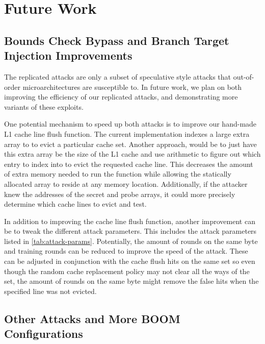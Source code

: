 \section{Future Work} \label{Future Work}

\subsection{Bounds Check Bypass and Branch Target Injection Improvements}

The replicated attacks are only a subset of speculative style attacks that out-of-order
microarchitectures are susceptible to. In future work, we plan on both improving the efficiency of
our replicated attacks, and demonstrating more variants of these exploits.

One potential mechanism to speed up both attacks is to improve our hand-made L1 cache line flush
function. The current implementation indexes a large extra array to to evict a particular cache set.
Another approach, would be to just have this extra array be the size of the L1 cache and use
arithmetic to figure out which entry to index into to evict the requested cache line.
This decreases the amount of extra memory needed to run the function while allowing the statically
allocated array to reside at any memory location. Additionally, if the attacker knew the addresses of
the secret and probe arrays, it could more precisely determine which cache lines to evict and test.

In addition to improving the cache line flush function, another
improvement can be to tweak the different attack parameters. This includes
the attack parameters listed in \ref{tab:attack-params}. Potentially, the amount of rounds on the
same byte and training rounds can be reduced to improve the speed of the attack.
These can be adjusted in conjunction with the cache flush hits on the same set so even though the 
random cache replacement policy may not clear all the ways of the set, the amount of rounds on
the same byte might remove the false hits when the specified line was not evicted.

\subsection{Other Attacks and More BOOM Configurations}

